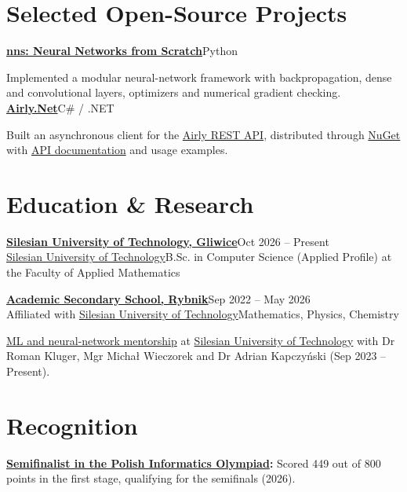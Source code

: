 \documentclass[10pt,a4paper]{article}
\newcommand{\entry}[4]{\textbf{#1}\hfill{\small #2}\\{\small #3\hfill\textcolor{muted}{#4}}\par}
\newcommand{\project}[3]{\textbf{\href{#2}{#1}}\hfill{\small\textcolor{muted}{#3}}\par}
\begin{document}
\section{Selected Open-Source Projects}
\project{nns: Neural Networks from Scratch}{https://github.com/Mondonno/nns}{Python}
Implemented a modular neural-network framework with backpropagation, dense and convolutional layers, optimizers and numerical gradient checking.\\[6pt]
\project{Airly.Net}{https://github.com/Mondonno/Airly.Net}{C\# / .NET}
Built an asynchronous client for the \href{https://developer.airly.org/docs}{Airly REST API}, distributed through \href{https://www.nuget.org/packages/AirlyNet/}{NuGet} with \href{https://mondonno.github.io/airly.net}{API documentation} and usage examples.
\section{Education \& Research}

\entry{\href{https://polsl.pl/}{Silesian University of Technology, Gliwice}}{Oct 2026 -- Present}{\href{https://www.linkedin.com/school/15098218/}{Silesian University of Technology}}{B.Sc. in Computer Science (Applied Profile) at the Faculty of Applied Mathematics}
\vspace{3pt}

\entry{\href{https://alorybnik.polsl.pl/}{Academic Secondary School, Rybnik}}{Sep 2022 -- May 2026}{Affiliated with \href{https://www.linkedin.com/school/15098218/}{Silesian University of Technology}}{Mathematics, Physics, Chemistry}
\vspace{2pt}
\href{https://www.linkedin.com/in/mikolajmocek/details/experience/}{ML and neural-network mentorship} at \href{https://www.linkedin.com/school/15098218/}{Silesian University of Technology} with Dr Roman Kluger, Mgr Michał Wieczorek and Dr Adrian Kapczyński (Sep 2023 -- Present).

\section{Recognition}
\textbf{\href{https://oi.edu.pl/l/33oi_1etap_wyniki/}{Semifinalist in the Polish Informatics Olympiad}:} Scored 449 out of 800 points in the first stage, qualifying for the semifinals (2026).
\end{document}
